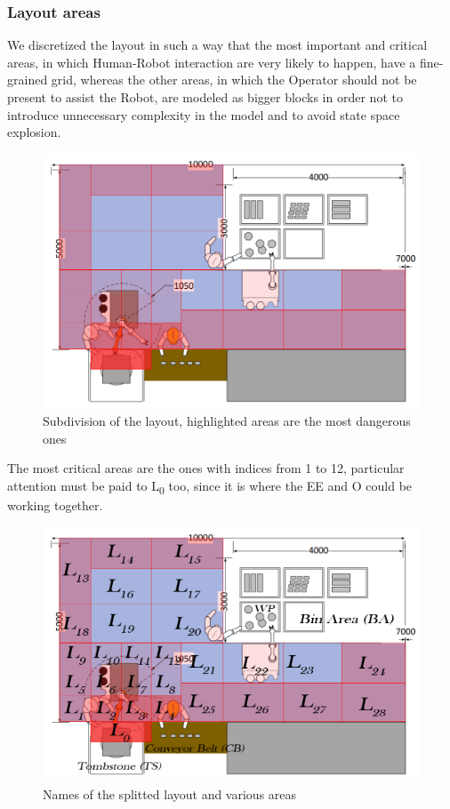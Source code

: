 \documentclass[a4paper]{article}
\begin{document}
\subsubsection{Layout areas}
We discretized the layout in such a way that the most important and critical areas, in which Human-Robot interaction are very likely to happen, have a fine-grained grid, whereas the other areas, in which the Operator should not be present to assist the Robot, are modeled as bigger blocks in order not to introduce unnecessary complexity in the model and to avoid state space explosion.
\begin{figure}[htp] 
\includegraphics[width=\textwidth]{images/layout} 
\caption{Subdivision of the layout, highlighted areas are the most dangerous ones} 
\label{fig:layout} 
\end{figure}

\clearpage
The most critical areas are the ones with indices from 1 to 12, particular attention must be paid to L\textsubscript0 too, since it is where the EE and O could be working together. 

\begin{figure}[htp] 
\includegraphics[width=\textwidth]{images/layoutnames} 
\caption{Names of the splitted layout and various areas} 
\label{fig:layout2} 
\end{figure}
\end{document}

